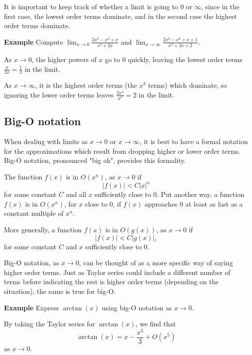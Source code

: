 \documentclass[a4paper]{book}
\begin{document}
\begin{sloppypar}
It is important to keep track of whether a limit is going to 0 or $\infty$, since in the first case, the lowest order terms dominate, and in the second case the highest order terms dominate.

\textbf{Example} Compute $\displaystyle \lim_{x \rightarrow 0} \frac{2x^3-x^2+x}{x^3+2x}$ and $\displaystyle \lim_{x \rightarrow \infty} \frac{2x^3-x^2+x+1}{x^3+2x+2}$.
\begin{examplebox}
As $x \rightarrow 0$, the higher powers of $x$ go to 0 quickly, leaving the lowest order terms $\frac{x}{2x} = \frac{1}{2}$ in the limit.

As $x \rightarrow \infty$, it is the highest order terms (the $x^3$ terms) which dominate, so ignoring the lower order terms leaves $\frac{2x^3}{x^3} = 2$ in the limit.
\end{examplebox}

\subsection{Big-O notation}
When dealing with limits as $x \rightarrow 0$ or $x \rightarrow \infty$, it is best to have a formal notation for the approximations which result from dropping higher or lower order terms. Big-O notation, pronounced "big oh", provides this formality.

\begin{definitionbox}[title=\textbf{Big-O notation, $x \rightarrow 0$}]
The function $f(x)$ is in $O(x^n)$, as $x \rightarrow 0$ if \[ |f(x)| < C|x|^n \] for some constant $C$ and all $x$ sufficiently close to 0. Put another way, a function $f(x)$ is in $O(x^n)$, for $x$ close to 0, if $f(x)$ approaches 0 at least as fast as a constant multiple of $x^n$.

More generally, a function $f(x)$ is in $O(g(x))$, as $x \rightarrow 0$ if \[ |f(x)| < C|g(x)|, \] for some constant $C$ and $x$ sufficiently close to 0.
\end{definitionbox}

Big-O notation, as $x \rightarrow 0$, can be thought of as a more specific way of saying higher order terms. Just as Taylor series could include a different number of terms before indicating the rest is higher order terms (depending on the situation), the same is true for big-O.

\textbf{Example} Express $\arctan(x)$ using big-O notation as $x \rightarrow 0$. 
\begin{examplebox}
By taking the Taylor series for $\arctan(x)$, we find that \[ \arctan(x)= x - \frac{x^3}{3} + O(x^5) \] as $x \rightarrow 0$.


\end{examplebox}
\end{sloppypar}
\end{document}
